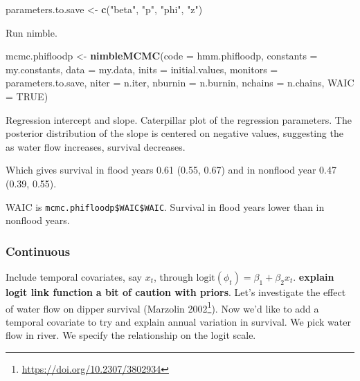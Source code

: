 \documentclass[
  12pt,
]{krantz}
\newenvironment{Shaded}{\begin{snugshade}}{\end{snugshade}}
\newcommand{\AttributeTok}[1]{\textcolor[rgb]{0.13,0.29,0.53}{#1}}
\newcommand{\ConstantTok}[1]{\textcolor[rgb]{0.56,0.35,0.01}{#1}}
\newcommand{\FunctionTok}[1]{\textcolor[rgb]{0.13,0.29,0.53}{\textbf{#1}}}
\newcommand{\NormalTok}[1]{#1}
\newcommand{\OtherTok}[1]{\textcolor[rgb]{0.56,0.35,0.01}{#1}}
\newcommand{\StringTok}[1]{\textcolor[rgb]{0.31,0.60,0.02}{#1}}
\renewcommand{\href}[2]{#2\footnote{\url{#1}}}
\begin{document}
\begin{Shaded}
\begin{Highlighting}[]
\NormalTok{parameters.to.save }\OtherTok{\textless{}{-}} \FunctionTok{c}\NormalTok{(}\StringTok{"beta"}\NormalTok{, }\StringTok{"p"}\NormalTok{, }\StringTok{"phi"}\NormalTok{, }\StringTok{"z"}\NormalTok{)}
\end{Highlighting}
\end{Shaded}

Run nimble.

\begin{Shaded}
\begin{Highlighting}[]
\NormalTok{mcmc.phifloodp }\OtherTok{\textless{}{-}} \FunctionTok{nimbleMCMC}\NormalTok{(}\AttributeTok{code =}\NormalTok{ hmm.phifloodp, }
                             \AttributeTok{constants =}\NormalTok{ my.constants,}
                             \AttributeTok{data =}\NormalTok{ my.data,              }
                             \AttributeTok{inits =}\NormalTok{ initial.values,}
                             \AttributeTok{monitors =}\NormalTok{ parameters.to.save,}
                             \AttributeTok{niter =}\NormalTok{ n.iter,}
                             \AttributeTok{nburnin =}\NormalTok{ n.burnin, }
                             \AttributeTok{nchains =}\NormalTok{ n.chains,}
                             \AttributeTok{WAIC =} \ConstantTok{TRUE}\NormalTok{)}
\end{Highlighting}
\end{Shaded}

Regression intercept and slope. Caterpillar plot of the regression parameters. The posterior distribution of the slope is centered on negative values, suggesting the as water flow increases, survival decreases.

Which gives survival in flood years 0.61 (0.55, 0.67) and in nonflood year 0.47 (0.39, 0.55).

WAIC is \texttt{mcmc.phifloodp\$WAIC\$WAIC}. Survival in flood years lower than in nonflood years.

\hypertarget{continuous}{%
\subsubsection{Continuous}\label{continuous}}

Include temporal covariates, say \(x_t\), through \(\text{logit}(\phi_t) = \beta_1 + \beta_2 x_t\). \textbf{explain logit link function} \textbf{a bit of caution with priors}. Let's investigate the effect of water flow on dipper survival (\href{https://doi.org/10.2307/3802934}{Marzolin 2002}). Now we'd like to add a temporal covariate to try and explain annual variation in survival. We pick water flow in river. We specify the relationship on the logit scale.
\end{document}
